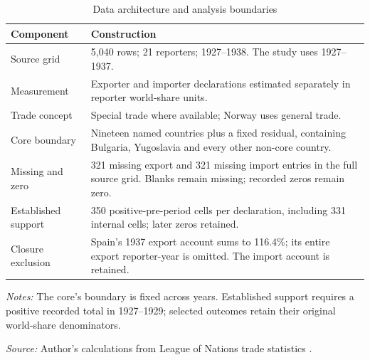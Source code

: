 \begin{table}[!htbp]\centering
\caption{Data architecture and analysis boundaries}\label{tab:data}
\begin{threeparttable}\small\setlength{\tabcolsep}{4pt}
\begin{tabularx}{\textwidth}{@{}p{}X@{}}
\toprule
Component & Construction \\
\midrule
Source grid & 5,040 rows; 21 reporters; 1927--1938. The study uses 1927--1937. \\
Measurement & Exporter and importer declarations estimated separately in reporter world-share units. \\
Trade concept & Special trade where available; Norway uses general trade. \\
Core boundary & Nineteen named countries plus a fixed \External{} residual, containing Bulgaria, Yugoslavia and every other non-core country. \\
Missing and zero & 321 missing export and 321 missing import entries in the full source grid. Blanks remain missing; recorded zeros remain zero. \\
Established support & 350 positive-pre-period cells per declaration, including 331 internal cells; later zeros retained. \\
Closure exclusion & Spain's 1937 export account sums to 116.4\%; its entire export reporter-year is omitted. The import account is retained. \\
\bottomrule
\end{tabularx}
\begin{tablenotes}[flushleft]\footnotesize\item \textit{Notes:} The core's \External{} boundary is fixed across years. Established support requires a positive recorded total in 1927--1929; selected outcomes retain their original world-share denominators.
\item \textit{Source:} Author's calculations from League of Nations trade statistics \parencite{league1930,league1936,league1938}.
\end{tablenotes}\end{threeparttable}\end{table}
